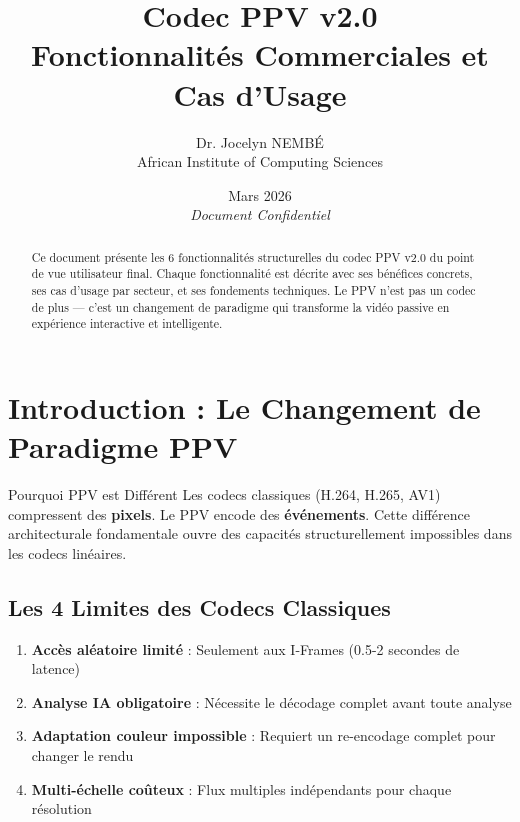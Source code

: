 \documentclass[12pt,a4paper]{article}
\title{\textbf{\color{ppvblue}Codec PPV v2.0} \\ Fonctionnalités Commerciales et Cas d'Usage}
\author{Dr. Jocelyn NEMBÉ \\ African Institute of Computing Sciences}
\date{Mars 2026 \\ \textit{Document Confidentiel}}
\begin{document}
	
	\maketitle
	
	\begin{abstract}
		\noindent Ce document présente les 6 fonctionnalités structurelles du codec PPV v2.0 du point de vue utilisateur final. Chaque fonctionnalité est décrite avec ses bénéfices concrets, ses cas d'usage par secteur, et ses fondements techniques. Le PPV n'est pas un codec de plus — c'est un changement de paradigme qui transforme la vidéo passive en expérience interactive et intelligente.
	\end{abstract}
	
	\tableofcontents
	\newpage
	
	\section{Introduction : Le Changement de Paradigme PPV}
	
	\begin{featurebox}{Pourquoi PPV est Différent}
		Les codecs classiques (H.264, H.265, AV1) compressent des \textbf{pixels}. Le PPV encode des \textbf{événements}. Cette différence architecturale fondamentale ouvre des capacités structurellement impossibles dans les codecs linéaires.
	\end{featurebox}
	
	\subsection{Les 4 Limites des Codecs Classiques}
	
	\begin{enumerate}[label=\textbf{\arabic*.}, leftmargin=*]
		\item \textbf{Accès aléatoire limité} : Seulement aux I-Frames (0.5-2 secondes de latence)
		\item \textbf{Analyse IA obligatoire} : Nécessite le décodage complet avant toute analyse
		\item \textbf{Adaptation couleur impossible} : Requiert un re-encodage complet pour changer le rendu
		\item \textbf{Multi-échelle coûteux} : Flux multiples indépendants pour chaque résolution
	\end{enumerate}
	
\end{document}
